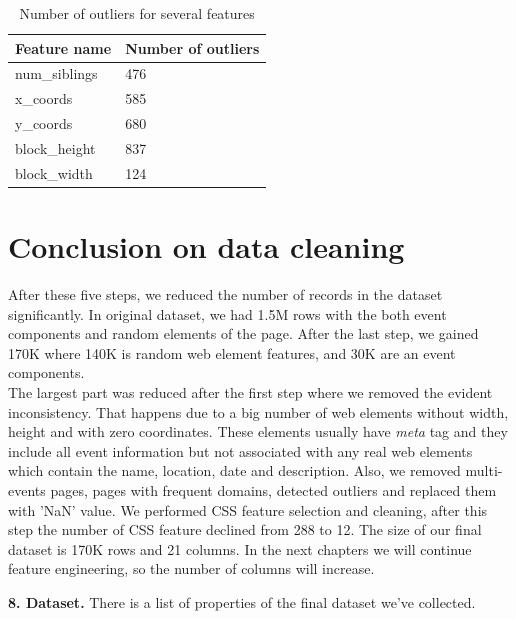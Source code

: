 \begin{table}[h]
\begin{center}
{\renewcommand{\arraystretch}{1.5}
\begin{tabular}{| p{5cm} | p{5cm}|}
\hline
\textbf{Feature name}	& \textbf{Number of outliers}\\
\hline
num\_siblings	& 476\\
\hline
x\_coords	& 585\\
\hline
y\_coords	& 680\\
\hline
block\_height	& 837\\
\hline
block\_width	& 124\\
\hline
\end{tabular}}
\caption{Number of outliers for several features}
\label{table:outlier}
\end{center}
\end{table}



\section*{Conclusion on data cleaning}
After these five steps, we reduced the number of records in the dataset significantly. In original dataset, we had 1.5M rows with the both event components and random elements of the page. After the last step, we gained 170K where 140K is random web element features, and 30K are an event components.\\
The largest part was reduced after the first step where we removed the evident inconsistency. That happens due to a big number of web elements without width, height and with zero coordinates. These elements usually have \textit{meta} tag and they include all event information but not associated with any real web elements which contain the name, location, date and description. Also, we removed multi-events pages, pages with frequent domains, detected outliers and replaced them with 'NaN' value. We performed CSS feature selection and cleaning, after this step the number of CSS feature declined from 288 to 12. The size of our final dataset is 170K rows and 21 columns. In the next chapters we will continue feature engineering, so the number of columns will increase.



\textbf{8. Dataset.} There is a list of properties of the final dataset we've collected.

